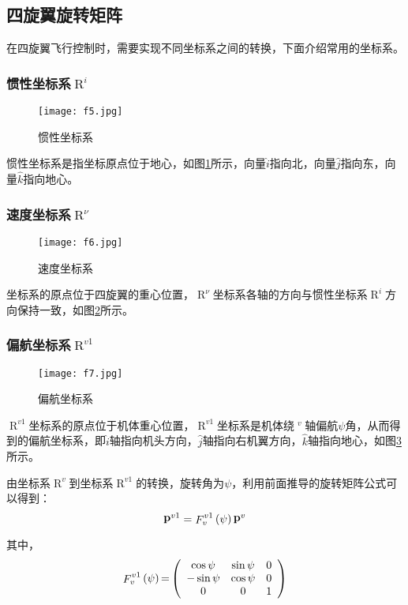 \subsection{四旋翼旋转矩阵}\label{2.1.2}
在四旋翼飞行控制时，需要实现不同坐标系之间的转换，下面介绍常用的坐标系。
\subsubsection{惯性坐标系$\mathop R\nolimits^i $}
\begin{figure}[!ht]
\centering
\texttt{[image: f5.jpg]}
\caption{惯性坐标系}
\label{fig4}
\end{figure}
惯性坐标系是指坐标原点位于地心，如图\ref{fig4}所示，向量$\hat i$指向北，向量$\hat j$指向东，向量$\hat k$指向地心。
\subsubsection{速度坐标系$\mathop R\nolimits^\nu  $}
\begin{figure}[!ht]
\centering
\texttt{[image: f6.jpg]}
\caption{速度坐标系}
\label{fig5}
\end{figure}
坐标系的原点位于四旋翼的重心位置，$\mathop R\nolimits^\nu  $坐标系各轴的方向与惯性坐标系$\mathop R\nolimits^i $方向保持一致，如图\ref{fig5}所示。
\subsubsection{偏航坐标系$\mathop R\nolimits^{v1} $}
\begin{figure}[!ht]
\centering
\texttt{[image: f7.jpg]}
\caption{偏航坐标系}
\label{fig6}
\end{figure}
$\mathop R\nolimits^{v1} $坐标系的原点位于机体重心位置，$\mathop R\nolimits^{v1} $坐标系是机体绕$\mathop {\hat k}\nolimits^v $轴偏航$\psi $角，从而得到的偏航坐标系，即$\hat i$轴指向机头方向，$\hat j$轴指向右机翼方向，$\hat k$轴指向地心，如图\ref{fig6}所示。

由坐标系$\mathop R\nolimits^v $到坐标系$\mathop R\nolimits^{v1} $的转换，旋转角为$\psi $，利用前面推导的旋转矩阵公式可以得到：
\[\mathop {\bf{p}}\nolimits^{v1}  = \mathop F\nolimits_v^{v1} \left( \psi  \right)\mathop {\bf{p}}\nolimits^v \]

其中，\[\mathop F\nolimits_v^{v1} \left( \psi  \right){\rm{ = }}\left( {\begin{array}{*{20}{c}}
{\cos \psi }&{\sin \psi }&0\\
{ - \sin \psi }&{\cos \psi }&0\\
0&0&1
\end{array}} \right)\]
